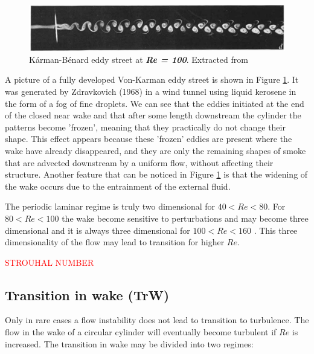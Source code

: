 \documentclass[journal]{new-aiaa}
\begin{document}
\begin{figure}[H]
\begin{center}
\includegraphics[width=1\textwidth]{Images/federico/Figure02}
\caption{Kárman-Bénard eddy street at \textbf{\textit{Re = 100}}. Extracted from \cite{Zdravkovich1968} }
\label{fig:Laminar}
\end{center}
\end{figure}

A picture of a fully developed Von-Karman eddy street is shown in Figure \ref{fig:Laminar}. It was generated by Zdravkovich (1968) \citep{Zdravkovich1968} in a wind tunnel using liquid kerosene in the form of a fog of fine droplets. We can see that the eddies initiated at the end of the closed near wake and that after some length downstream the cylinder the patterns become 'frozen', meaning that they practically do not change their shape. This effect appears because these 'frozen' eddies are present where the wake have already disappeared, and they are only the remaining shapes of smoke that are advected downstream by a uniform flow, without affecting their structure. Another feature that can be noticed in Figure \ref{fig:Laminar} is that the widening of the wake occurs due to the entrainment of the external fluid.

The periodic laminar regime is truly two dimensional for $40<Re<80$. For  $80<Re<100$ the wake become sensitive to perturbations and may become three dimensional and it is always three dimensional for  $100<Re<160$ \cite{Phillips1956}. This three dimensionality of the flow may lead to transition for higher $Re$.

\Huge{\textcolor{red}{STROUHAL NUMBER}}

\normalsize

 

\subsection{Transition in wake (TrW)}

Only in rare cases a flow instability does not lead to transition to turbulence. The flow in the wake of a circular cylinder will eventually become turbulent if $Re$ is increased. The transition in wake may be divided into two regimes:
\end{document}
